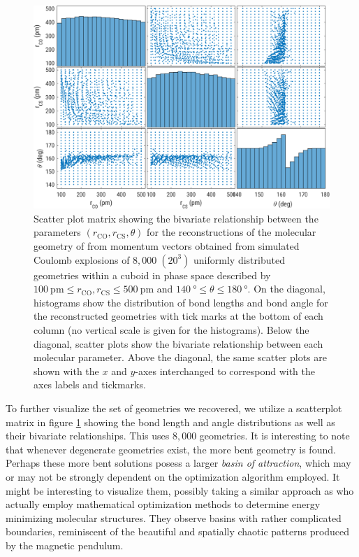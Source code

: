 \begin{figure}
  \centering
  \includegraphics[width=\textwidth]{Plots/OCS222DegeneracyMapHDPairs}
  \caption[Scatter plot matrix showing the bivariate relationship between the parameters $(r_\mathrm{CO}, r_\mathrm{CS}, \theta)$ for the reconstructions of the molecular geometry of  from momentum vectors obtained from simulated Coulomb explosions.]
  {Scatter plot matrix showing the bivariate relationship between the parameters $(r_\mathrm{CO}, r_\mathrm{CS}, \theta)$ for the reconstructions of the molecular geometry of  from momentum vectors obtained from simulated Coulomb explosions of $8,000 \; (20^3)$ uniformly distributed geometries within a cuboid in phase space described by $\SI{100}{\pico\meter} \le r_\mathrm{CO}, r_\mathrm{CS} \le \SI{500}{\pico\meter}$ and $\SI{140}{\degree} \le \theta \le \SI{180}{\degree}$. On the diagonal, histograms show the distribution of bond lengths and bond angle for the reconstructed geometries with tick marks at the bottom of each column (no vertical scale is given for the histograms). Below the diagonal, scatter plots show the bivariate relationship between each molecular parameter. Above the diagonal, the same scatter plots are shown with the $x$ and $y$-axes interchanged to correspond with the axes labels and tickmarks.}
  \label{fig:OCS222DegeneracyMapHDPairs}
\end{figure}

To further visualize the set of geometries we recovered, we utilize a scatterplot matrix in figure \ref{fig:OCS222DegeneracyMapHDPairs} showing the bond length and angle distributions as well as their bivariate relationships. This uses $8,000$ geometries. It is interesting to note that whenever degenerate geometries exist, the more bent geometry is found. Perhaps these more bent solutions posess a larger \emph{basin of attraction}, which may or may not be strongly dependent on the optimization algorithm employed. It might be interesting to visualize them, possibly taking a similar approach as \citet{Asenjo13} who actually employ mathematical optimization methods to determine energy minimizing molecular structures. They observe basins with rather complicated boundaries, reminiscent of the beautiful and spatially chaotic patterns produced by the magnetic pendulum.

